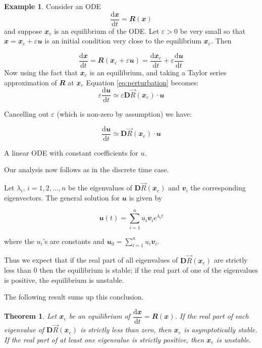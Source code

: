 \documentclass[
  a4paper,
  oneside,
  final]{krantz}
\renewcommand{\epsilon}{\varepsilon}
\renewcommand{\d}{\mathrm{d}}
\renewcommand{\v}[1]{{\mathbfit{#1}}}
\newcommand{\der}[2]{\dfrac{\d #1}{\d #2}}
\newcommand{\jacobr}{\mathbf{D}\vec{R}}
\newtheorem{theorem}{Theorem}[chapter]
\theoremstyle{definition}
\theoremstyle{definition}
\newtheorem{example}{Example}[chapter]
\theoremstyle{definition}
\theoremstyle{definition}
\theoremstyle{remark}
\begin{document}
\begin{example}
\protect\hypertarget{exm:stabilityschematic}{}\label{exm:stabilityschematic}Consider an ODE
\[ \der{\v{x}}{t} = \v{R}(\v{x}) \]
and suppose \(\v{x}_{e}\) is an equilibrium of the ODE. Let \(\epsilon>0\) be very small so that \(\v{x} = \v{x}_{e} + \epsilon \v{u}\) is an initial condition very close to the equilibrium \(\v{x}_{e}\). Then

\begin{equation}
\der{\v{x}}{t} = \v{R}(\v{x}_{e} + \epsilon \v{u}) = \der{\v{x}_{e}}{t} + \epsilon \der{\v{u}}{t} \label{eq:perturbation}
\end{equation}
Now using the fact that \(\v{x}_{e}\) is an equilibrium, and taking a Taylor series approximation of \(\v{R}\) at \(\v{x}_{e}\) Equation \eqref{eq:perturbation} becomes:
\[ \epsilon \der{\v{u}}{t} \simeq \epsilon \jacobr(\v{x}_{e}) \cdot \v{u} \]

Cancelling out \(\epsilon\) (which is non-zero by assumption) we have:

\[ \der{\v{u}}{t} \simeq  \jacobr(\v{x}_{e}) \cdot \v{u} \]

A linear ODE with constant coefficients for \(u\).

Our analysis now follows as in the discrete time case.

Let \(\lambda_{i}\), \(i = 1,2,\ldots, n\) be the eigenvalues of \(\jacobr(\v{x}_{e})\) and \(\v{v}_{i}\) the corresponding eigenvectors. The general solution for \(\v{u}\) is given by

\[\v{u}(t) = \sum_{i =1}^{n} {u}_i \v{v}_{i} e^{\lambda_i t} \]

where the \(u_i\)'s are constants and \(\v{u}_{0} = \sum_{i =1}^{n} {u}_i \v{v}_{i}\).

Thus we expect that if the real part of all eigenvalues of \(\jacobr(\v{x}_{e})\) are strictly less than \(0\) then the equilibrium is stable; if the real part of one of the eigenvalues is positive, the equilibrium is unstable.
\end{example}

The following result sums up this conclusion.

\begin{theorem}
\protect\hypertarget{thm:stabilityconttime}{}\label{thm:stabilityconttime}Let \(\v{x}_{e}\) be an equilibrium of \(\der{\v{x}}{t} = \v{R}(\v{x})\). If the real part of each eigenvalue of \(\jacobr(\v{x}_{e})\) is strictly less than zero, then \(\v{x}_{e}\) is asymptotically stable. If the real part of at least one eigenvalue is strictly positive, then \(\v{x}_{e}\) is unstable.
\end{theorem}
\end{document}
